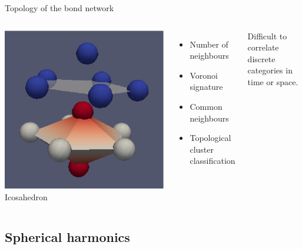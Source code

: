 \begin{frame}{Topology of the bond network}
\begin{columns}
	\bigskip
	\includegraphics[width=\columnwidth]{ico_13_1551}\\
	Icosahedron
	\begin{itemize}
		\item Number of neighbours
		\item Voronoi signature \citet{tanemura1977geometrical}
		\item Common neighbours \citet{Honeycutt1987}
		\item Topological cluster classification \citet{Williams2007}
	\end{itemize}
	Difficult to correlate discrete categories in time or space.
	\end{columns}
\end{frame}

\subsection{Spherical harmonics}

